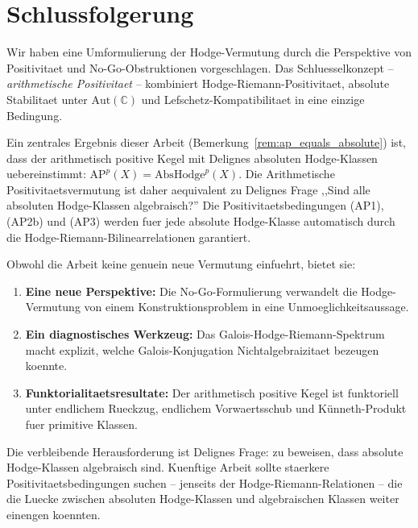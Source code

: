 \documentclass[aps,prd,twocolumn,superscriptaddress,nofootinbib]{revtex4-2}
\theoremstyle{definition}
\theoremstyle{remark}
\begin{document}
\section{Schlussfolgerung}
\label{sec:conclusion}

Wir haben eine Umformulierung der Hodge-Vermutung durch die Perspektive von Positivitaet und No-Go-Obstruktionen vorgeschlagen. Das Schluesselkonzept -- \textit{arithmetische Positivitaet} -- kombiniert Hodge-Riemann-Positivitaet, absolute Stabilitaet unter $\mathrm{Aut}(\mathbb{C})$ und Lefschetz-Kompatibilitaet in eine einzige Bedingung.

Ein zentrales Ergebnis dieser Arbeit (Bemerkung~\ref{rem:ap_equals_absolute}) ist, dass der arithmetisch positive Kegel mit Delignes absoluten Hodge-Klassen uebereinstimmt: $\mathrm{AP}^p(X) = \mathrm{AbsHodge}^p(X)$. Die Arithmetische Positivitaetsvermutung ist daher aequivalent zu Delignes Frage ,,Sind alle absoluten Hodge-Klassen algebraisch?'' Die Positivitaetsbedingungen (AP1), (AP2b) und (AP3) werden fuer jede absolute Hodge-Klasse automatisch durch die Hodge-Riemann-Bilinearrelationen garantiert.

Obwohl die Arbeit keine genuein neue Vermutung einfuehrt, bietet sie:

\begin{enumerate}
\item \textbf{Eine neue Perspektive:} Die No-Go-Formulierung verwandelt die Hodge-Vermutung von einem Konstruktionsproblem in eine Unmoeglichkeitsaussage.

\item \textbf{Ein diagnostisches Werkzeug:} Das Galois-Hodge-Riemann-Spektrum macht explizit, welche Galois-Konjugation Nichtalgebraizitaet bezeugen koennte.

\item \textbf{Funktorialitaetsresultate:} Der arithmetisch positive Kegel ist funktoriell unter endlichem Rueckzug, endlichem Vorwaertsschub und K\"unneth-Produkt fuer primitive Klassen.
\end{enumerate}

Die verbleibende Herausforderung ist Delignes Frage: zu beweisen, dass absolute Hodge-Klassen algebraisch sind. Kuenftige Arbeit sollte staerkere Positivitaetsbedingungen suchen -- jenseits der Hodge-Riemann-Relationen -- die die Luecke zwischen absoluten Hodge-Klassen und algebraischen Klassen weiter einengen koennten.
\end{document}

